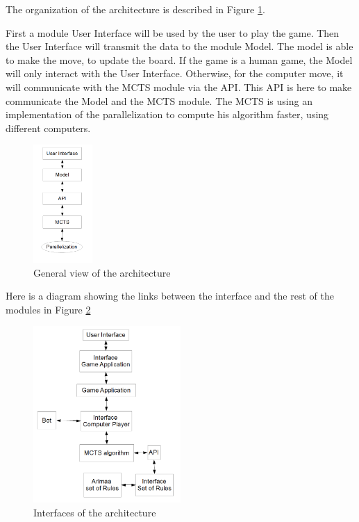 The organization of the architecture is described in Figure \ref{fig:gra}.

First a module User Interface will be used by the user to play the game. Then the User Interface will transmit the data to the module Model. The model is able to make the move, to update the board. If the game is a human game, the Model will only interact with the User Interface. Otherwise, for the computer move, it will communicate with the MCTS module via the API. This API is here to make communicate the Model and the MCTS module. The MCTS is using an implementation of the parallelization to compute his algorithm faster, using different computers.

\begin{figure}[!h]
\centering
\includegraphics[width=0.2\textwidth]{2General_Architecture/2.1.2GeneralView/graphe.png}
\caption{General view of the architecture}
\label{fig:gra}
\end{figure}


Here is a diagram showing the links between the interface and the rest of the modules in Figure \ref{fig:gen}

\begin{figure}[!h]
\centering
\includegraphics[width=0.5\textwidth]{2General_Architecture/2.1.2GeneralView/gen.png}
\caption{Interfaces of the architecture}
\label{fig:gen}
\end{figure}


